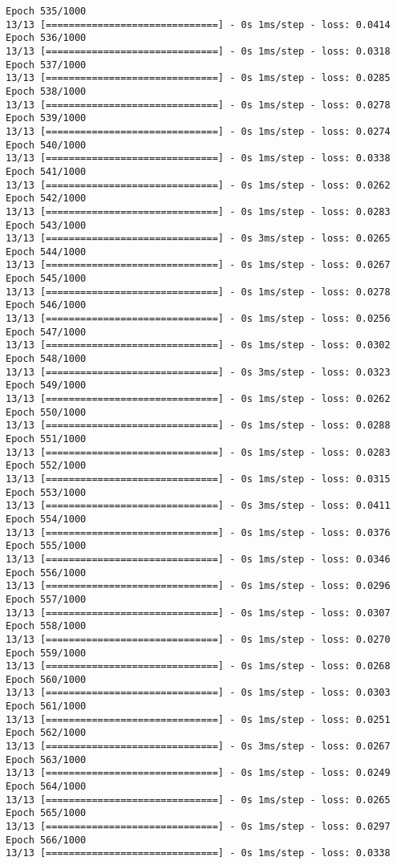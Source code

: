 \documentclass[11pt]{article}
\begin{document}
\begin{Verbatim}[commandchars=\\\{\}]
Epoch 535/1000
13/13 [==============================] - 0s 1ms/step - loss: 0.0414
Epoch 536/1000
13/13 [==============================] - 0s 1ms/step - loss: 0.0318
Epoch 537/1000
13/13 [==============================] - 0s 1ms/step - loss: 0.0285
Epoch 538/1000
13/13 [==============================] - 0s 1ms/step - loss: 0.0278
Epoch 539/1000
13/13 [==============================] - 0s 1ms/step - loss: 0.0274
Epoch 540/1000
13/13 [==============================] - 0s 1ms/step - loss: 0.0338
Epoch 541/1000
13/13 [==============================] - 0s 1ms/step - loss: 0.0262
Epoch 542/1000
13/13 [==============================] - 0s 1ms/step - loss: 0.0283
Epoch 543/1000
13/13 [==============================] - 0s 3ms/step - loss: 0.0265
Epoch 544/1000
13/13 [==============================] - 0s 1ms/step - loss: 0.0267
Epoch 545/1000
13/13 [==============================] - 0s 1ms/step - loss: 0.0278
Epoch 546/1000
13/13 [==============================] - 0s 1ms/step - loss: 0.0256
Epoch 547/1000
13/13 [==============================] - 0s 1ms/step - loss: 0.0302
Epoch 548/1000
13/13 [==============================] - 0s 3ms/step - loss: 0.0323
Epoch 549/1000
13/13 [==============================] - 0s 1ms/step - loss: 0.0262
Epoch 550/1000
13/13 [==============================] - 0s 1ms/step - loss: 0.0288
Epoch 551/1000
13/13 [==============================] - 0s 1ms/step - loss: 0.0283
Epoch 552/1000
13/13 [==============================] - 0s 1ms/step - loss: 0.0315
Epoch 553/1000
13/13 [==============================] - 0s 3ms/step - loss: 0.0411
Epoch 554/1000
13/13 [==============================] - 0s 1ms/step - loss: 0.0376
Epoch 555/1000
13/13 [==============================] - 0s 1ms/step - loss: 0.0346
Epoch 556/1000
13/13 [==============================] - 0s 1ms/step - loss: 0.0296
Epoch 557/1000
13/13 [==============================] - 0s 1ms/step - loss: 0.0307
Epoch 558/1000
13/13 [==============================] - 0s 1ms/step - loss: 0.0270
Epoch 559/1000
13/13 [==============================] - 0s 1ms/step - loss: 0.0268
Epoch 560/1000
13/13 [==============================] - 0s 1ms/step - loss: 0.0303
Epoch 561/1000
13/13 [==============================] - 0s 1ms/step - loss: 0.0251
Epoch 562/1000
13/13 [==============================] - 0s 3ms/step - loss: 0.0267
Epoch 563/1000
13/13 [==============================] - 0s 1ms/step - loss: 0.0249
Epoch 564/1000
13/13 [==============================] - 0s 1ms/step - loss: 0.0265
Epoch 565/1000
13/13 [==============================] - 0s 1ms/step - loss: 0.0297
Epoch 566/1000
13/13 [==============================] - 0s 1ms/step - loss: 0.0338

\end{Verbatim}
\end{document}
